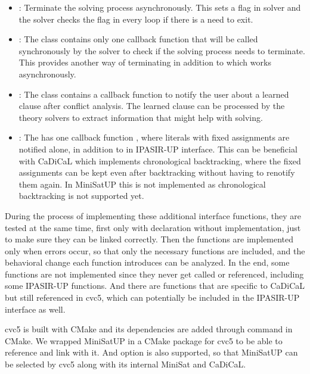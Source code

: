 \begin{itemize}
\begin{itemize}
    \item {}: Terminate the solving process asynchronously. This sets a flag in solver and the solver checks the flag in every loop if there is a need to exit.
    \item {}: The  class contains only one callback function  that will be called synchronously by the solver to check if the solving process needs to terminate. This provides another way of terminating in addition to  which works asynchronously.
    \item {}: The  class contains a callback function  to notify the user about a learned clause after conflict analysis. The learned clause can be processed by the theory solvers to extract information that might help with solving.
    \item {}: The  has one callback function , where literals with fixed assignments are notified alone, in addition to  in IPASIR-UP interface. This can be beneficial with CaDiCaL which implements chronological backtracking, where the fixed assignments can be kept even after backtracking without having to renotify them again. In MiniSatUP this is not implemented as chronological backtracking is not supported yet.
  \end{itemize}
\end{itemize}

During the process of implementing these additional interface functions, they are tested at the same time, first only with declaration without implementation, just to make sure they can be linked correctly. Then the functions are implemented only when errors occur, so that only the necessary functions are included, and the behavioral change each function introduces can be analyzed. In the end, some functions are not implemented since they never get called or referenced, including some IPASIR-UP functions. And there are functions that are specific to CaDiCaL but still referenced in cvc5, which can potentially be included in the IPASIR-UP interface as well.

cvc5 is built with CMake and its dependencies are added through  command in CMake. We wrapped MiniSatUP in a CMake package for cvc5 to be able to reference and link with it. And option  is also supported, so that MiniSatUP can be selected by cvc5 along with its internal MiniSat and CaDiCaL.
